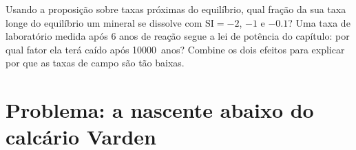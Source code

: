 \begin{exercise}[$\star\star\star$]\label{exo:b3:water-rock-interaction:12}
Usando a proposição sobre taxas próximas do equilíbrio, qual fração da sua
taxa longe do equilíbrio um mineral se dissolve com $\mathrm{SI} =
-2$, $-1$ e $-0.1$? Uma taxa de laboratório medida após 6 anos de reação
segue a lei de potência do capítulo: por qual fator ela terá caído
após \num{10000}~anos? Combine os dois efeitos para explicar por que as taxas de campo são
tão baixas.
\end{exercise}

\section{Problema: a nascente abaixo do calcário Varden}

